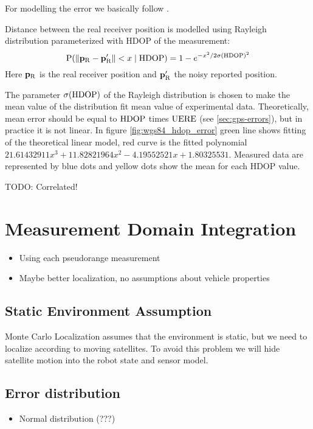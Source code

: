 For modelling the error we basically follow \cite{www-wilson}.

Distance between the real receiver position is modelled using Rayleigh distribution
parameterized with HDOP of the measurement:
\begin{equation}
	\operatorname{\mathrm{P}}(\lVert\mathbf{p_\mathrm{R}} - \mathbf{p'_\mathrm{R}}\rVert < x \mid \mathrm{HDOP}) =
		1 - e^{-x^2/2\sigma(\mathrm{HDOP})^2}
\end{equation}
Here \(\mathbf{p_\mathrm{R}}\) is the real receiver position and \(\mathbf{p'_\mathrm{R}}\)
the noisy reported position.

The parameter \(\sigma(\mathrm{HDOP})\) of the Rayleigh distribution is chosen to make the
mean value of the distribution fit mean value of experimental data.
Theoretically, mean error should be equal to \(\mathrm{HDOP}\) times \(\mathrm{UERE}\) (see \ref{sec:gps-errors}),
but in practice it is not linear.
In figure \ref{fig:wgs84_hdop_error} green line shows fitting of the theoretical linear model,
red curve is the fitted polynomial \(\num{21.61432911}x^3 + \num{11.82821964}x^2 - 
\num{4.19552521}x + \num{1.80325531}\).
Measured data are represented by blue dots and yellow dots show the mean for each HDOP value.

TODO: Correlated!

\section{Measurement Domain Integration}
\label{sec:measurement_domain}
\begin{itemize}
\item Using each pseudorange measurement
\item Maybe better localization, no assumptions about vehicle properties
\end{itemize}

\subsection{Static Environment Assumption}
\label{sec:gps-mcl-static-env}
Monte Carlo Localization assumes that the environment is static, but we need to
localize according to moving satellites.
To avoid this problem we will hide satellite motion into the robot state and sensor model.

\subsection{Error distribution}
\begin{itemize}
\item Normal distribution (???)
\end{itemize}

